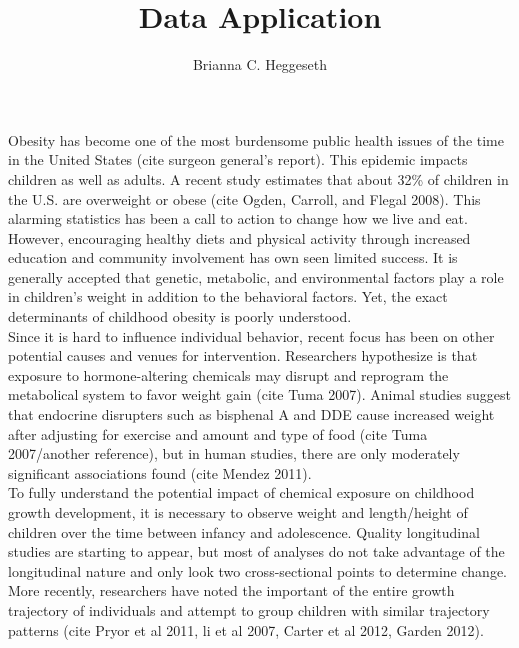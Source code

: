 \documentclass[11pt]{article}
\title{Data Application}
\author{Brianna C. Heggeseth}
\begin{document}
\doublespace
\maketitle

Obesity has become one of the most burdensome public health issues of the time in the United States (cite surgeon general's report).  This epidemic impacts children as well as adults.  A recent study estimates that about 32\% of children in the U.S. are overweight or obese (cite Ogden, Carroll, and Flegal 2008). This alarming statistics has been a call to action to change how we live and eat. However, encouraging healthy diets and physical activity through increased education and community involvement has own seen limited success.  It is generally accepted that genetic, metabolic, and environmental factors play a role in children's weight in addition to the behavioral factors. Yet, the exact determinants of childhood obesity is poorly understood.\\

Since it is hard to influence individual behavior, recent focus has been on other potential causes and venues for intervention. Researchers hypothesize is that exposure to hormone-altering chemicals may disrupt and reprogram the metabolical system to favor weight gain (cite Tuma 2007). Animal studies suggest that endocrine disrupters such as bisphenal A and DDE cause increased weight after adjusting for exercise and amount and type of food (cite Tuma 2007/another reference), but in human studies, there are only moderately significant associations found (cite Mendez 2011).\\
 
 To fully understand the potential impact of chemical exposure on childhood growth development, it is necessary to observe weight and length/height of children over the time between infancy and adolescence. Quality longitudinal studies are starting to appear, but most of analyses do not take advantage of the longitudinal nature and only look two cross-sectional points to determine change. More recently, researchers have noted the important of the entire growth trajectory of individuals and attempt to group children with similar trajectory patterns (cite Pryor et al 2011, li et al 2007, Carter et al 2012, Garden 2012). \\
\end{document}
